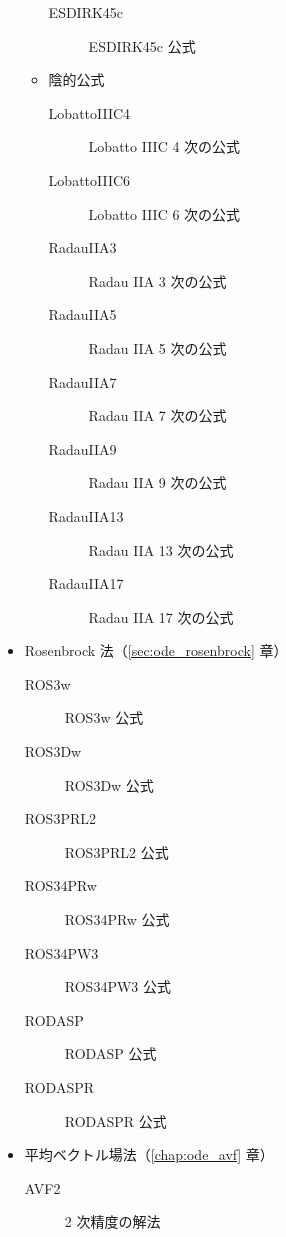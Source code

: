 \begin{itemize}
\begin{itemize}
\begin{description}
                        \item[ESDIRK45c] ESDIRK45c 公式 \cite{Jorgensen2018}
                    \end{description}
              \item 陰的公式
                    \begin{description}
                        \item[LobattoIIIC4] Lobatto IIIC 4 次の公式 \cite{Hairer1991}
                        \item[LobattoIIIC6] Lobatto IIIC 6 次の公式 \cite{Hairer1991}
                        \item[RadauIIA3] Radau IIA 3 次の公式 \cite{Hairer1991}
                        \item[RadauIIA5] Radau IIA 5 次の公式 \cite{Hairer1991}
                        \item[RadauIIA7] Radau IIA 7 次の公式 \cite{Hairer1991}
                        \item[RadauIIA9] Radau IIA 9 次の公式 \cite{Hairer1991}
                        \item[RadauIIA13] Radau IIA 13 次の公式 \cite{Hairer1991}
                        \item[RadauIIA17] Radau IIA 17 次の公式 \cite{Hairer1991}
                    \end{description}
          \end{itemize}
    \item Rosenbrock 法（\ref{sec:ode_rosenbrock} 章）
          \begin{description}
              \item[ROS3w] ROS3w 公式 \cite{Rang2005}
              \item[ROS3Dw] ROS3Dw 公式 \cite{Rang2005}
              \item[ROS3PRL2] ROS3PRL2 公式 \cite{Rang2015}
              \item[ROS34PRw] ROS34PRw 公式 \cite{Rang2015}
              \item[ROS34PW3] ROS34PW3 公式 \cite{Rang2005}
              \item[RODASP] RODASP 公式 \cite{Steinebach2022}
              \item[RODASPR] RODASPR 公式 \cite{Rang2015}
          \end{description}
    \item 平均ベクトル場法（\ref{chap:ode_avf} 章）
          \begin{description}
              \item[AVF2] 2 次精度の解法

\end{description}
\end{itemize}
